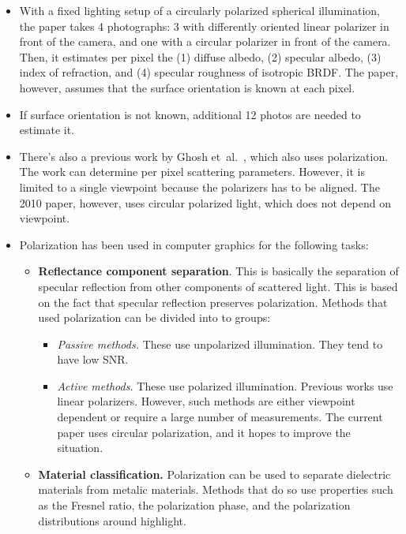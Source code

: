 \documentclass[10pt]{article}
\newcommand{\etal}{{et~al.}}
\begin{document}
    \begin{itemize}
    \item With a fixed lighting setup of a circularly polarized spherical illumination, the paper takes 4 photographs: 3 with differently oriented linear polarizer in front of the camera, and one with a circular polarizer in front of the camera.  Then, it estimates per pixel the (1) diffuse albedo, (2) specular albedo, (3) index of refraction, and (4) specular roughness of isotropic BRDF.  The paper, however, assumes that the surface orientation is known at each pixel.

    \item If surface orientation is not known, additional 12 photos are needed to estimate it.

    \item There's also a previous work by Ghosh \etal\ \cite{Ghosh:2009}, which also uses polarization.  The work can determine per pixel scattering parameters.  However, it is limited to a single viewpoint because the polarizers has to be aligned.  The 2010 paper, however, uses circular polarized light, which does not depend on viewpoint.

    \item Polarization has been used in computer graphics for the following tasks:
    \begin{itemize}
        \item \textbf{Reflectance component separation}.  This is basically the separation of specular reflection from other components of scattered light.  This is based on the fact that specular reflection preserves polarization.  Methods that used polarization can be divided into to groups:
        \begin{itemize}
            \item \textit{Passive methods.}  These use unpolarized illumination.  They tend to have low SNR.
            \item \textit{Active methods.}  These use polarized illumination.  Previous works use linear polarizers.  However, such methods are either viewpoint dependent or require a large number of measurements.  The current paper uses circular polarization, and it hopes to improve the situation.
        \end{itemize} 
        
        \item \textbf{Material classification.}  Polarization can be used to separate dielectric materials from metalic materials.  Methods that do so use properties such as the Fresnel ratio, the polarization phase, and the polarization distributions around highlight.
        

\end{itemize}
\end{itemize}
\end{document}
